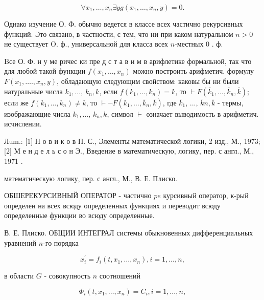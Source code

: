 \documentclass[10pt]{article}
\begin{document}
\[

\forall x_{1}, \ldots, x_{n} \exists y g\left(x_{1}, \ldots, x_{n}, y\right)=0 .

\]



Однако изучение О. Ф. обычно ведется в классе всех частично рекурсивных функций. Это связано, в частности, с тем, что ни при каком натуральном $n>0$ не существует O. ф., универсальной для класса всех $n$-местных 0 . ф.



Bсе О. Ф. н у ме ричес ки пре д с т а в и м в арифлетике формальной, так что для любой такой функции $f\left(x_{1}, \ldots, x_{n}\right)$ можно построить арифметич. формулу $F\left(x_{1}, \ldots ., x_{n}, y\right)$, обладающую следующим свойством: каковы бы ни были натуральные числа $k_{1}, \ldots$, $k_{n}, k$, если $f\left(k_{1}, \ldots, k_{n}\right)=k$, то $\vdash F\left(\bar{k}_{1}, \ldots, \bar{k}_{n}, \bar{k}\right)$; если же $f\left(k_{1}, \ldots, k_{n}\right) \neq k$, то $\vdash \neg F\left(k_{1}, \ldots, \bar{k}_{n}, \bar{k}\right)$, где $\bar{k}_{1}$, ..., $\bar{k} n, \bar{k}$ - термы, изображающие числа $k_{1}, \ldots$, $k_{n}, k$, символ $\vdash$ означает выводимость в арифметич. исчислении.



Лum.: [1] Н о в и к о в П. С., Элементы математической логики, 2 изд., М., 1973; [2] М е н д е л ь с о н Э., Введение в математическую, логику, пер. с англ., М., 1971 .



математическую логику, пер. с англ., М., В. Е. Плиско.



ОБШЕРЕКУРСИВНЫЙ ОПЕРАТОР - частично $p e$ курсивный оператор, к-рый определен на всех всюду определенных функциях и переводит всюду определенные функции во всюду определенные.



В. Е. Плиско. ОБЩИИ ИНТЕГРАЛ системы обыкновенных дифференциальных уравнений $n$-го порядка



\[

x_{i}^{\prime}=f_{i}\left(t, x_{1}, \ldots, x_{n}\right), i=1, \ldots, n,

\]



в области $G$ - совокупность $n$ соотношений



\[

\Phi_{i}\left(t, x_{1}, \ldots, x_{n}\right)=C_{i}, i=1, \ldots, n,

\]
\end{document}
